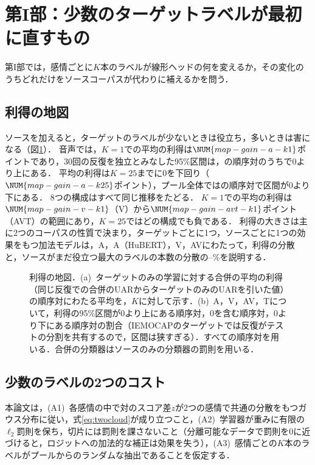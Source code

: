 \section{第I部：少数のターゲットラベルが最初に直すもの}
\label{sec:part1-what-few-labels-fix}

第I部では，感情ごとに$K$本のラベルが線形ヘッドの何を変えるか，その変化のうちどれだけをソースコーパスが代わりに補えるかを問う．

\subsection{利得の地図}
\label{sec:part1-map}

ソースを加えると，ターゲットのラベルが少ないときは役立ち，多いときは害になる（図\ref{fig:gainmap}）．
音声では，$K=1$での平均の利得は$\NUM{map-gain-a-k1}$ポイントであり，30回の反復を独立とみなした95\%区間は，の順序対のうちで0より上にある．
平均の利得は$K=25$までに0を下回り（$\NUM{map-gain-a-k25}$ポイント），プール全体ではの順序対で区間が0より下にある．
8つの構成はすべて同じ推移をたどる．
$K=1$での平均の利得は$\NUM{map-gain-v-k1}$（V）から$\NUM{map-gain-avt-k1}$ポイント（AVT）の範囲にあり，$K=25$ではどの構成でも負である．
利得の大きさは主に2つのコーパスの性質で決まり，ターゲットごとに1つ，ソースごとに1つの効果をもつ加法モデルは，A，A（HuBERT），V，AVにわたって，利得の分散と，ソースがまだ役立つ最大のラベルの本数の分散の--\%を説明する．

\begin{figure}[t]
\centering
{}
\caption{利得の地図．(a)~ターゲットのみの学習に対する合併の平均の利得（同じ反復での合併のUARからターゲットのみのUARを引いた値）の順序対にわたる平均を，$K$に対して示す．(b)~A，V，AV，Tについて，利得の95\%区間が0より上にある順序対，0を含む順序対，0より下にある順序対の割合（IEMOCAPのターゲットでは反復がテストの分割を共有するので，区間は狭すぎる）．すべての順序対を用いる．合併の分類器はソースのみの分類器の罰則を用いる．}
\label{fig:gainmap}
\end{figure}

\subsection{少数のラベルの2つのコスト}
\label{sec:part1-costs}

本論文は，(A1)~各感情の中で対のスコア差$z$が2つの感情で共通の分散をもつガウス分布に従い，式\eqref{eq:twocloud}が成り立つこと，(A2)~学習器が重みに有限の$\ell_2$罰則を保ち，切片には罰則を課さないこと（分離可能なデータで罰則を0に近づけると，ロジットへの加法的な補正は効果を失う\cite{kini2021labelimbalanced}），(A3)~感情ごとの$K$本のラベルがプールからのランダムな抽出であることを仮定する．

